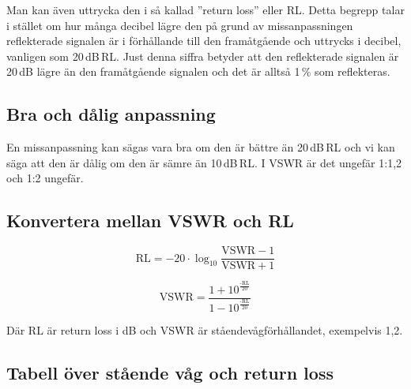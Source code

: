 Man kan även uttrycka den i så kallad ''return loss'' eller RL. Detta begrepp
talar i stället om hur många decibel lägre den på grund av missanpassningen
reflekterade signalen är i förhållande till den framåtgående och uttrycks i
decibel, vanligen som 20\,dB\,RL. Just denna siffra betyder att den
reflekterade signalen är 20\,dB lägre än den framåtgående signalen och det är
alltså 1\,\% som reflekteras.

\subsection{Bra och dålig anpassning}

En missanpassning kan sägas vara bra om den är bättre än 20\,dB\,RL och vi kan
säga att den är dålig om den är sämre än 10\,dB\,RL. I VSWR är det ungefär
1:1,2 och 1:2 ungefär.

\subsection{Konvertera mellan VSWR och RL}

\begin{equation}
	\text{RL} = -20 \cdot \log_{10} \frac{\text{VSWR}-1}{\text{VSWR}+1}
\end{equation}

\begin{equation}
	\text{VSWR} = \frac{1+10^\frac{\text{-RL}}{20}}{1-10^\frac{\text{-RL}}{20}}
\end{equation}

Där RL är return loss i dB och VSWR är ståendevågförhållandet, exempelvis 1,2.

\subsection{Tabell över stående våg och return loss}

